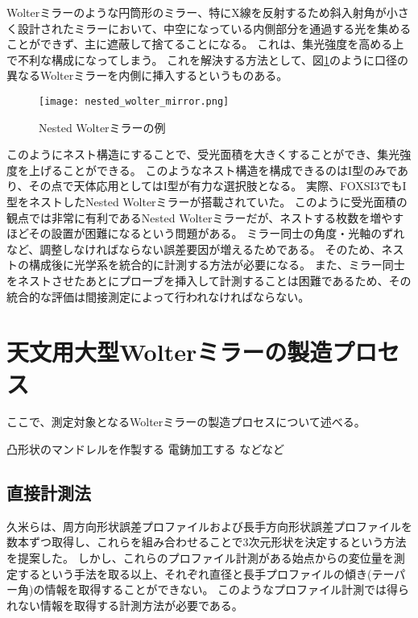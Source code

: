 Wolterミラーのような円筒形のミラー、特にX線を反射するため斜入射角が小さく設計されたミラーにおいて、中空になっている内側部分を通過する光を集めることができず、主に遮蔽して捨てることになる。
これは、集光強度を高める上で不利な構成になってしまう。
これを解決する方法として、図\ref{fig:nested_wolter_mirror}のように口径の異なるWolterミラーを内側に挿入するというものある。

\begin{figure}[b]
\centering
\texttt{[image: nested\_wolter\_mirror.png]}
\caption{Nested Wolterミラーの例}
\label{fig:nested_wolter_mirror}
\end{figure}

このようにネスト構造にすることで、受光面積を大きくすることができ、集光強度を上げることができる。
このようなネスト構造を構成できるのはI型のみであり、その点で天体応用としてはI型が有力な選択肢となる。
実際、FOXSI3でもI型をネストしたNested Wolterミラーが搭載されていた。
このように受光面積の観点では非常に有利であるNested Wolterミラーだが、ネストする枚数を増やすほどその設置が困難になるという問題がある。
ミラー同士の角度・光軸のずれなど、調整しなければならない誤差要因が増えるためである。
そのため、ネストの構成後に光学系を統合的に計測する方法が必要になる。
また、ミラー同士をネストさせたあとにプローブを挿入して計測することは困難であるため、その統合的な評価は間接測定によって行われなければならない。

\clearpage
\newpage
\section{天文用大型Wolterミラーの製造プロセス}
\label{chap1_wolter_fabrication_process}

ここで、測定対象となるWolterミラーの製造プロセスについて述べる。

凸形状のマンドレルを作製する
電鋳加工する
などなど

\subsection{直接計測法}


久米らは、周方向形状誤差プロファイルおよび長手方向形状誤差プロファイルを数本ずつ取得し、これらを組み合わせることで3次元形状を決定するという方法を提案した。\cite{Kume2017}
しかし、これらのプロファイル計測がある始点からの変位量を測定するという手法を取る以上、それぞれ直径と長手プロファイルの傾き(テーパー角)の情報を取得することができない。
このようなプロファイル計測では得られない情報を取得する計測方法が必要である。


